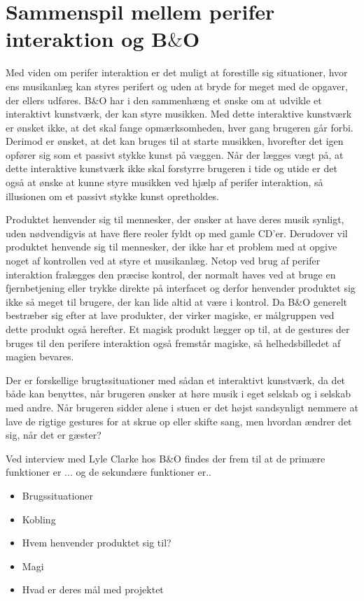 \section{Sammenspil mellem perifer interaktion og B$\&$O}
\label{Sammenspil mellem perifer interaktion og BO}

Med viden om perifer interaktion er det muligt at forestille sig situationer, hvor ens musikanlæg kan styres perifert og uden at bryde for meget med de opgaver, der ellers udføres. B$\&$O har i den sammenhæng et ønske om at udvikle et interaktivt kunstværk, der kan styre musikken. Med dette interaktive kunstværk er ønsket ikke, at det skal fange opmærksomheden, hver gang brugeren går forbi. Derimod er ønsket, at det kan bruges til at starte musikken, hvorefter det igen opfører sig som et passivt stykke kunst på væggen. Når der lægges vægt på, at dette interaktive kunstværk ikke skal forstyrre brugeren i tide og utide er det også at ønske at kunne styre musikken ved hjælp af perifer interaktion, så illusionen om et passivt stykke kunst opretholdes. 

Produktet henvender sig til mennesker, der ønsker at have deres musik synligt, uden nødvendigvis at have flere reoler fyldt op med gamle CD'er. Derudover vil produktet henvende sig til mennesker, der ikke har et problem med at opgive noget af kontrollen ved at styre et musikanlæg. Netop ved brug af perifer interaktion fralægges den præcise kontrol, der normalt haves ved at bruge en fjernbetjening eller trykke direkte på interfacet og derfor henvender produktet sig ikke så meget til brugere, der kan lide altid at være i kontrol. Da B$\&$O generelt bestræber sig efter at lave produkter, der virker magiske, er målgruppen ved dette produkt også herefter. Et magisk produkt lægger op til, at de gestures der bruges til den perifere interaktion også fremstår magiske, så helhedsbilledet af magien bevares. 

Der er forskellige brugtssituationer med sådan et interaktivt kunstværk, da det både kan benyttes, når brugeren ønsker at høre musik i eget selskab og i selskab med andre. Når brugeren sidder alene i stuen er det højst sandsynligt nemmere at lave de rigtige gestures for at skrue op eller skifte sang, men hvordan ændrer det sig, når det er gæster? 

Ved interview med Lyle Clarke hos B$\&$O findes der frem til at de primære funktioner er ... og de sekundære funktioner er..



\begin{itemize}
  \item Brugssituationer 
  \item Kobling
  \item Hvem henvender produktet sig til?
  \item Magi
  \item Hvad er deres mål med projektet
\end{itemize}

